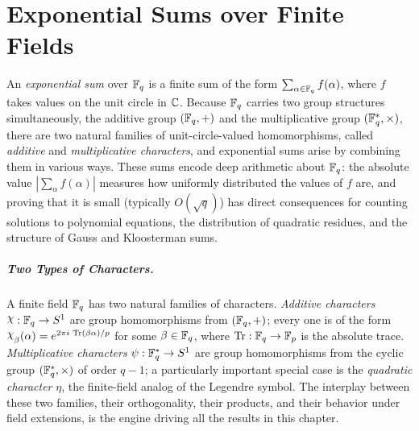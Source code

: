 \chapter{Exponential Sums over Finite Fields}

An \emph{exponential sum} over $\mathbb{F}_q$ is a finite sum of the form $\sum_{\alpha\in\mathbb{F}_q} f(\alpha)$, where $f$ takes values on the unit circle in $\mathbb{C}$. Because $\mathbb{F}_q$ carries two group structures simultaneously, the additive group $(\mathbb{F}_q,+)$ and the multiplicative group $(\mathbb{F}_q^*,\times)$, there are two natural families of unit-circle-valued homomorphisms, called \emph{additive} and \emph{multiplicative characters}, and exponential sums arise by combining them in various ways. These sums encode deep arithmetic about $\mathbb{F}_q$: the absolute value $|\sum_\alpha f(\alpha)|$ measures how uniformly distributed the values of $f$ are, and proving that it is small (typically $O(\sqrt{q})$) has direct consequences for counting solutions to polynomial equations, the distribution of quadratic residues, and the structure of Gauss and Kloosterman sums.


\paragraph*{Two Types of Characters.}
A finite field $\mathbb{F}_q$ has two natural families of characters. \emph{Additive characters} $\chi:\bbF_q\to S^1$ are group homomorphisms from $(\mathbb{F}_q,+)$; every one is of the form $\chi_\beta(\alpha)=e^{2\pi i\,\tr(\beta\alpha)/p}$ for some $\beta\in\mathbb{F}_q$, where $\operatorname{Tr}:\mathbb{F}_q\to\mathbb{F}_p$ is the absolute trace. \emph{Multiplicative characters} $\psi:\mathbb{F}_q^*\to S^1$ are group homomorphisms from the cyclic group $(\mathbb{F}_q^*,\times)$ of order $q-1$; a particularly important special case is the \emph{quadratic character} $\eta$, the finite-field analog of the Legendre symbol. The interplay between these two families, their orthogonality, their products, and their behavior under field extensions, is the engine driving all the results in this chapter.












